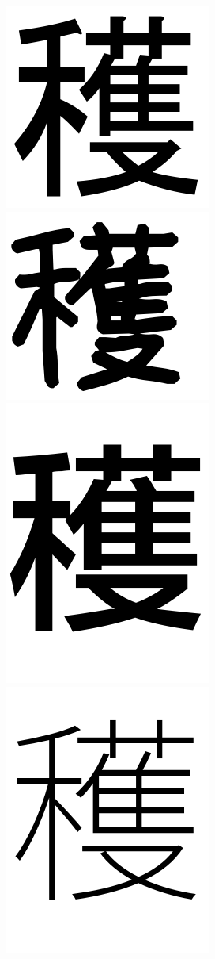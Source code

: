\documentclass[10pt,twocolumn,letterpaper]{article}
\begin{document}
\begin{figure}[t]
    \includegraphics[width=0.4\columnwidth]{../data/kanji-Gothic/kanji_225.png}
    \includegraphics[width=0.4\columnwidth]{../data/kanji-HonyaJi/kanji_225.png}
    \includegraphics[width=0.4\columnwidth]{../data/kanji-Lantinghei/kanji_225.png}
    \includegraphics[width=0.4\columnwidth]{../data/kanji-GenEiExtraLight/kanji_225.png}

\end{figure}
\end{document}
